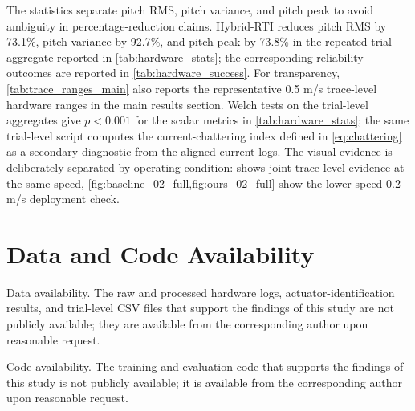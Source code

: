 \documentclass[twoside,final,1p,times]{elsarticle}
\newenvironment{revblock}{}{}
\begin{document}
\begin{table}[H]
\begin{revblock}
\centering
\caption{Trace-level 0.5 m/s hardware ranges retained in the main results section as a compact trace-level summary. Repeated-trial means and confidence intervals in \cref{tab:hardware_stats} are used for the primary statistical claims.}
\label{tab:trace_ranges_main}
\small
{}
\end{revblock}
\end{table}

\begin{revblock}
The statistics separate pitch RMS, pitch variance, and pitch peak to avoid ambiguity in percentage-reduction claims. Hybrid-RTI reduces pitch RMS by 73.1\%, pitch variance by 92.7\%, and pitch peak by 73.8\% in the repeated-trial aggregate reported in \cref{tab:hardware_stats}; the corresponding reliability outcomes are reported in \cref{tab:hardware_success}. For transparency, \cref{tab:trace_ranges_main} also reports the representative 0.5 m/s trace-level hardware ranges in the main results section. Welch tests on the trial-level aggregates give $p<0.001$ for the scalar metrics in \cref{tab:hardware_stats}; the same trial-level script computes the current-chattering index defined in \cref{eq:chattering} as a secondary diagnostic from the aligned current logs. The visual evidence is deliberately separated by operating condition:  shows joint trace-level evidence at the same speed, \cref{fig:baseline_02_full,fig:ours_02_full} show the lower-speed 0.2 m/s deployment check.
\end{revblock}

\section{Data and Code Availability}
\label{sec:data_availability}
\begin{revblock}
Data availability. The raw and processed hardware logs, actuator-identification results, and trial-level CSV files that support the findings of this study are not publicly available; they are available from the corresponding author upon reasonable request.

Code availability. The training and evaluation code that supports the findings of this study is not publicly available; it is available from the corresponding author upon reasonable request.
\end{revblock}
\end{document}
